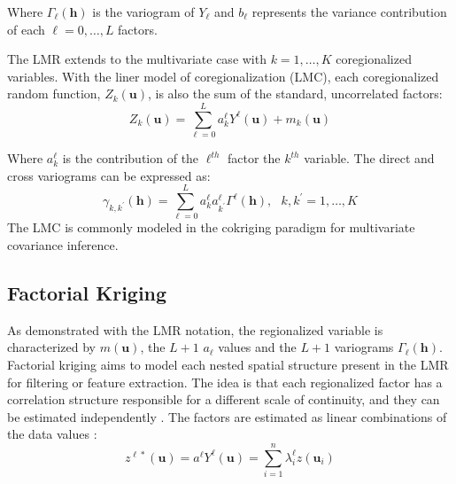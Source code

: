 Where $\Gamma_{\ell}(\mathbf{h})$ is the variogram of $Y_{\ell}$ and $b_{\ell}$ represents the variance contribution of each $\ell=0,\dots,L$ factors.

The LMR extends to the multivariate case with $k=1,\dots,K$ coregionalized variables. With the liner model of coregionalization (LMC), each coregionalized random function, $Z_{k}(\mathbf{u})$, is also the sum of the standard, uncorrelated factors:
\begin{equation*}
    Z_{k}(\mathbf{u}) = \sum_{\ell=0}^{L} a^{\ell}_{k} Y^{\ell}(\mathbf{u}) + m_{k}(\mathbf{u})
\end{equation*}

Where $a^{\ell}_{k}$ is the contribution of the $\ell^{th}$ factor the $k^{th}$ variable. The direct and cross variograms can be expressed as:
\begin{equation*}
    \gamma_{k,k^{\prime}}(\mathbf{h}) = \sum_{\ell=0}^{L} a^{\ell}_{k} a^{\ell}_{k^{\prime}} \Gamma^{\ell}(\mathbf{h}), \ \ \ k,k^{\prime} = 1,\dots,K
\end{equation*}
The LMC is commonly modeled in the cokriging paradigm for multivariate covariance inference.

\subsection{Factorial Kriging}
\label{subsec:01factorial}

As demonstrated with the LMR notation, the regionalized variable is characterized by $m(\mathbf{u})$, the $L + 1$ $a_{\ell}$ values and the $L + 1$ variograms $\Gamma_{\ell}(\mathbf{h})$. Factorial kriging aims to model each nested spatial structure present in the LMR for filtering or feature extraction. The idea is that each regionalized factor has a correlation structure responsible for a different scale of continuity, and they can be estimated independently \citep{matheron1982factorial}. The factors are estimated as linear combinations of the data values \cite{deutsch2007recall}:
\begin{equation*}
    z^{\ell*}(\mathbf{u}) = a^{\ell} Y^{\ell}(\mathbf{u}) = \sum_{i=1}^{n} \lambda_{i}^{\ell} z(\mathbf{u}_{i})
\end{equation*}


